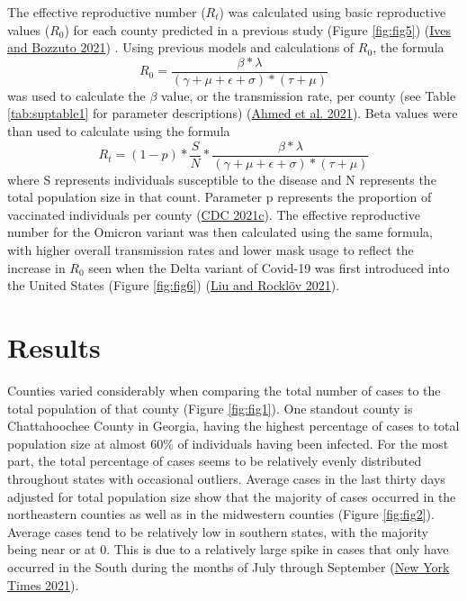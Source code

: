 \documentclass[
  12pt,
]{article}
\begin{document}
The effective reproductive number (\(R_t\)) was calculated using basic reproductive values (\(R_0\)) for each county predicted in a previous study (Figure \ref{fig:fig5}) (\protect\hyperlink{ref-ives_estimating_2021}{Ives and Bozzuto 2021}) . Using previous models and calculations of \(R_0\), the formula
\[R_0 = \frac{\beta*\lambda}{(\gamma+\mu+\epsilon+\sigma)*(\tau+\mu)}\]
was used to calculate the \(\beta\) value, or the transmission rate, per county (see Table \ref{tab:suptable1} for parameter descriptions) (\protect\hyperlink{ref-ahmed_mathematical_2021}{Ahmed et al. 2021}). Beta values were than used to calculate using the formula
\[R_t = (1-p)*\frac{S}{N}*\frac{\beta*\lambda}{(\gamma+\mu+\epsilon+\sigma)*(\tau+\mu)}\]
where S represents individuals susceptible to the disease and N represents the total population size in that count. Parameter p represents the proportion of vaccinated individuals per county (\protect\hyperlink{ref-cdc_covid-19_2021}{CDC 2021c}). The effective reproductive number for the Omicron variant was then calculated using the same formula, with higher overall transmission rates and lower mask usage to reflect the increase in \(R_0\) seen when the Delta variant of Covid-19 was first introduced into the United States (Figure \ref{fig:fig6}) (\protect\hyperlink{ref-liu_reproductive_2021}{Liu and Rocklöv 2021}).

\hypertarget{results}{%
\section{Results}\label{results}}

Counties varied considerably when comparing the total number of cases to the total population of that county (Figure \ref{fig:fig1}). One standout county is Chattahoochee County in Georgia, having the highest percentage of cases to total population size at almost 60\% of individuals having been infected. For the most part, the total percentage of cases seems to be relatively evenly distributed throughout states with occasional outliers. Average cases in the last thirty days adjusted for total population size show that the majority of cases occurred in the northeastern counties as well as in the midwestern counties (Figure \ref{fig:fig2}). Average cases tend to be relatively low in southern states, with the majority being near or at 0. This is due to a relatively large spike in cases that only have occurred in the South during the months of July through September (\protect\hyperlink{ref-new_york_times_coronavirus_2021}{New York Times 2021}).
\end{document}
